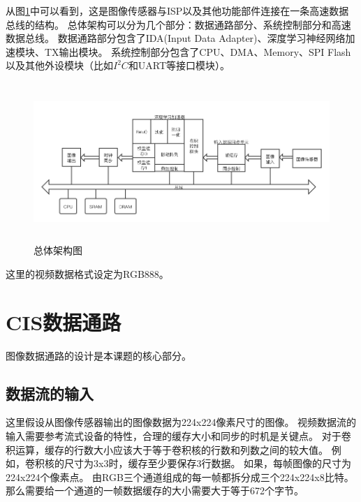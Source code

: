 从图\ref{fig:top_arch}中可以看到，这是图像传感器与ISP以及其他功能部件连接在一条高速数据总线的结构。
总体架构可以分为几个部分：数据通路部分、系统控制部分和高速数据总线。
数据通路部分包含了IDA(Input Data Adapter)、深度学习神经网络加速模块、TX输出模块。
系统控制部分包含了CPU、DMA、Memory、SPI Flash以及其他外设模块（比如$I^2C$和UART等接口模块）。
\begin{figure}[htbp]
    \centering
    \includegraphics[width=15cm,height=6cm]{figures/top_arch.png}
    \caption{总体架构图}
    \label{fig:top_arch}
\end{figure}
这里的视频数据格式设定为RGB888。

\section{CIS数据通路}
图像数据通路的设计是本课题的核心部分。


\subsection{数据流的输入}

这里假设从图像传感器输出的图像数据为224x224像素尺寸的图像。
视频数据流的输入需要参考流式设备的特性，合理的缓存大小和同步的时机是关键点。
对于卷积运算，缓存的行数大小应该大于等于卷积核的行数和列数之间的较大值。
例如，卷积核的尺寸为3x3时，缓存至少要保存3行数据。
如果，每帧图像的尺寸为224x224个像素点。
由RGB三个通道组成的每一帧都拆分成三个224x224x8比特。
那么需要给一个通道的一帧数据缓存的大小需要大于等于672个字节。


